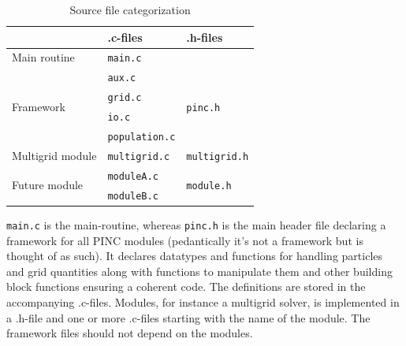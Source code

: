 \documentclass[10pt,a4paper]{article}
\begin{document}
\begin{table}
	\centering
	\caption{Source file categorization}
	\begin{tabular}{|l l l|}
		\hline
										& .c-files 				& .h-files 							\\
		\hline \hline
		Main routine						& \verb$main.c$			&									\\
		\hline
		\multirow{4}{*}{Framework}		& \verb$aux.c$			& \multirow{4}{*}{\texttt{pinc.h}}	\\
										& \verb$grid.c$			&									\\
										& \verb$io.c$			&									\\
										& \verb$population.c$	&									\\
		\hline \hline
		Multigrid module					& \verb$multigrid.c$		& \verb$multigrid.h$					\\
		\hline
		\multirow{2}{*}{Future module}	& \verb$moduleA.c$		& \multirow{2}{*}{\texttt{module.h}}	\\
										& \verb$moduleB.c$		& 									\\
		\hline
	\end{tabular}
	\label{tab:files}
\end{table}

\verb$main.c$ is the main-routine, whereas \verb$pinc.h$ is the main header file declaring a framework for all PINC modules (pedantically it's not a framework but is thought of as such). It declares datatypes and functions for handling particles and grid quantities along with functions to manipulate them and other building block functions ensuring a coherent code. The definitions are stored in the accompanying .c-files. Modules, for instance a multigrid solver, is implemented in a .h-file and one or more .c-files starting with the name of the module. The framework files should not depend on the modules.
\end{document}
